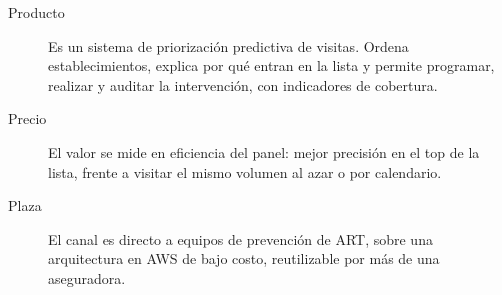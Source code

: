 \begin{description}
	\item[Producto]
	Es un sistema de priorizaci\'on predictiva de visitas.
	Ordena establecimientos, explica por qu\'e entran en la lista y permite programar, realizar y auditar la intervenci\'on, con indicadores de cobertura.
	\item[Precio]
	El valor se mide en eficiencia del panel: mejor precisi\'on en el top de la lista, frente a visitar el mismo volumen al azar o por calendario.
	\item[Plaza]
	El canal es directo a equipos de prevenci\'on de ART, sobre una arquitectura en AWS de bajo costo, reutilizable por m\'as de una aseguradora.
\end{description}
